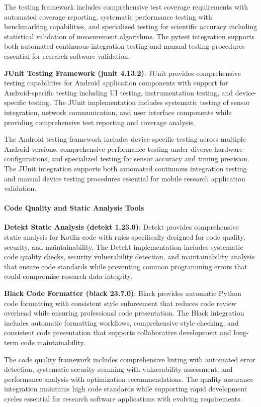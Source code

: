 \documentclass[12pt,a4paper]{report}
\begin{document}
The testing framework includes comprehensive test coverage requirements with automated coverage reporting, systematic
performance testing with benchmarking capabilities, and specialized testing for scientific accuracy including
statistical validation of measurement algorithms. The pytest integration supports both automated continuous integration
testing and manual testing procedures essential for research software validation.

\textbf{JUnit Testing Framework (junit 4.13.2)}: JUnit provides comprehensive testing capabilities for Android application
components with support for Android-specific testing including UI testing, instrumentation testing, and device-specific
testing. The JUnit implementation includes systematic testing of sensor integration, network communication, and user
interface components while providing comprehensive test reporting and coverage analysis.

The Android testing framework includes device-specific testing across multiple Android versions, comprehensive
performance testing under diverse hardware configurations, and specialized testing for sensor accuracy and timing
precision. The JUnit integration supports both automated continuous integration testing and manual device testing
procedures essential for mobile research application validation.

\paragraph{Code Quality and Static Analysis Tools}

\textbf{Detekt Static Analysis (detekt 1.23.0)}: Detekt provides comprehensive static analysis for Kotlin code with rules
specifically designed for code quality, security, and maintainability. The Detekt implementation includes systematic
code quality checks, security vulnerability detection, and maintainability analysis that ensure code standards while
preventing common programming errors that could compromise research data integrity.

\textbf{Black Code Formatter (black 23.7.0)}: Black provides automatic Python code formatting with consistent style
enforcement that reduces code review overhead while ensuring professional code presentation. The Black integration
includes automatic formatting workflows, comprehensive style checking, and consistent code presentation that supports
collaborative development and long-term code maintainability.

The code quality framework includes comprehensive linting with automated error detection, systematic security scanning
with vulnerability assessment, and performance analysis with optimization recommendations. The quality assurance
integration maintains high code standards while supporting rapid development cycles essential for research software
applications with evolving requirements.
\end{document}
